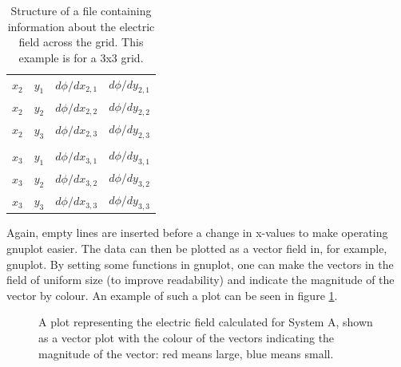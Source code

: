 \begin{table}
{\begin{tabularx}{0.44\textwidth}{ |XXXX| }
        $x_2$ & $y_1$ & $d{\phi}/dx_{2,1}$ & $d{\phi}/dy_{2,1}$ \\
        $x_2$ & $y_2$ & $d{\phi}/dx_{2,2}$ & $d{\phi}/dy_{2,2}$ \\
        $x_2$ & $y_3$ & $d{\phi}/dx_{2,3}$ & $d{\phi}/dy_{2,3}$ \\
        & & & \\
        $x_3$ & $y_1$ & $d{\phi}/dx_{3,1}$ & $d{\phi}/dy_{3,1}$ \\
        $x_3$ & $y_2$ & $d{\phi}/dx_{3,2}$ & $d{\phi}/dy_{3,2}$ \\
        $x_3$ & $y_3$ & $d{\phi}/dx_{3,3}$ & $d{\phi}/dy_{3,3}$ \\
        \hline
    \end{tabularx}
    \label{table:field_data}
    \caption{Structure of a file containing information about the electric field across the grid. This example is for a 3x3 grid.}
    }
\end{table}

Again, empty lines are inserted before a change in x-values to make operating gnuplot easier. The data can then be plotted as a vector field in, for example, gnuplot. By setting some functions in gnuplot, one can make the vectors in the field of uniform size (to improve readability) and indicate the magnitude of the vector by colour. An example of such a plot can be seen in figure \ref{fig:vectorfieldplot}.

\begin{figure}[h!]
    \centering
    \setlength\fboxsep{0pt}
    \setlength\fboxrule{0.5pt}
    \caption{A plot representing the electric field calculated for System A, shown as a vector plot with the colour of the vectors indicating the magnitude of the vector: red means large, blue means small.}
    \label{fig:vectorfieldplot}
\end{figure}
 
